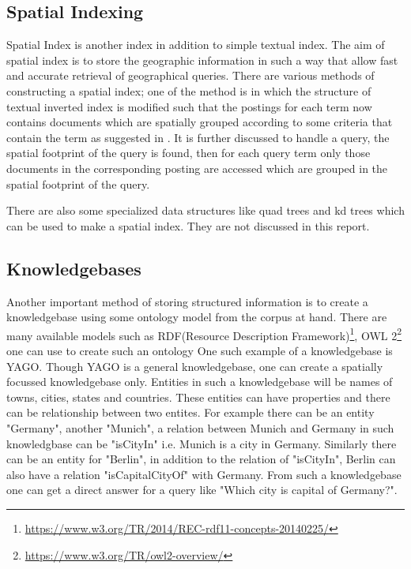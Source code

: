 \documentclass[
     11pt,         %
     a4paper,      %
     oneside,
     ]{article}
\begin{document}
\subsection{Spatial Indexing} Spatial Index is another index in addition to simple textual index. The aim of spatial index is to store the geographic information in such a way that allow fast and accurate retrieval of geographical queries. There are various methods of constructing a spatial index; one of the method is in which the structure of textual inverted index is modified such that the postings for each term now contains documents which are spatially grouped according to some criteria that contain the term as suggested in \cite{Vaid:2005:SIG:2156226.2156244}. It is further discussed to handle a query, the spatial footprint of the query is found, then for each query term only those documents in the corresponding posting are accessed which are grouped in the spatial footprint of the query. 

There are also some specialized data structures like quad trees and kd trees which can be used to make a spatial index. They are not discussed in this report. 

\subsection{Knowledgebases}
Another important method of storing structured information is to create a knowledgebase using some ontology model from the corpus at hand. There are many available models such as RDF(Resource Description Framework)\footnote{\url{https://www.w3.org/TR/2014/REC-rdf11-concepts-20140225/}}, OWL 2\footnote{\url{https://www.w3.org/TR/owl2-overview/}} one can use to create such an ontology One such example of a knowledgebase is YAGO. Though YAGO is a general knowledgebase, one can create a spatially focussed knowledgebase only. Entities in such a knowledgebase will be names of towns, cities, states and countries. These entities can have properties and there can be relationship between two entites. For example there can be an entity "Germany", another "Munich", a relation between Munich and Germany in such knowledgbase can be "isCityIn" i.e. Munich is a city in Germany. Similarly there can be an entity for "Berlin", in addition to the relation of "isCityIn", Berlin can also have a relation "isCapitalCityOf" with Germany. From such a knowledgebase one can get a direct answer for a query like "Which city is capital of Germany?".
\end{document}
